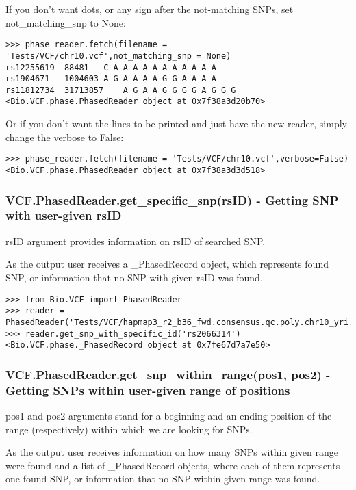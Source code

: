 \noindent If you don't want dots, or any sign after the not-matching SNPs, set not\_matching\_snp to None:

\begin{verbatim}
>>> phase_reader.fetch(filename = 'Tests/VCF/chr10.vcf',not_matching_snp = None)
rs12255619	88481	C A A A A A A A A A A A
rs1904671	1004603	A G A A A A G G A A A A
rs11812734	31713857	A G A A G G G G A G G G
<Bio.VCF.phase.PhasedReader object at 0x7f38a3d20b70>
\end{verbatim}

\noindent Or if you don't want the lines to be printed and just have the new reader, simply change the verbose to False:

\begin{verbatim}
>>> phase_reader.fetch(filename = 'Tests/VCF/chr10.vcf',verbose=False)
<Bio.VCF.phase.PhasedReader object at 0x7f38a3d3d518>
\end{verbatim}

\subsubsection{VCF.PhasedReader.get_specific_snp(rsID) - Getting SNP with user-given rsID}

\noindent rsID argument provides information on rsID of searched SNP.

\noindent As the output user receives a _PhasedRecord object, which represents found SNP, or information that no SNP with given rsID was found.

\begin{verbatim}
>>> from Bio.VCF import PhasedReader
>>> reader = PhasedReader('Tests/VCF/hapmap3_r2_b36_fwd.consensus.qc.poly.chr10_yri.D.phased')
>>> reader.get_snp_with_specific_id('rs2066314')
<Bio.VCF.phase._PhasedRecord object at 0x7fe67d7a7e50>

\end{verbatim}

\subsubsection{VCF.PhasedReader.get_snp_within_range(pos1, pos2) - Getting SNPs within user-given range of positions}

\noindent pos1 and pos2 arguments stand for a beginning and an ending position of the range (respectively) within which we are looking for SNPs.

\noindent As the output user receives information on how many SNPs within given range were found and a list of _PhasedRecord objects, where each of them represents
one found SNP, or information that no SNP within given range was found.

